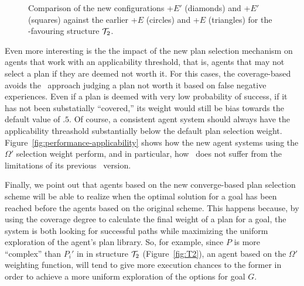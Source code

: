 \begin{figure*}[t]
\begin{center}
\subfigure[Structure $\T_2$]{\label{fig:T2_result2}

}
\qquad
\subfigure[Structure $\T_4$]{\label{fig:T4_result}

}

\caption{Comparison of the new configurations \BUL+$E'$ (diamonds) and \CL+$E'$
(squares) against the earlier \BUL+$E$ (circles) and \CL+$E$ (triangles) for the
\BUL-favouring structure $\T_2$.}
\end{center}
\end{figure*}



Even more interesting is the the impact of the new plan selection mechanism on
agents that work with an applicability threshold, that is, agents that may not
select a plan if they are deemed not worth it. For this cases, the coverage-based
avoids the \CL\ approach judging a plan not worth it based on false negative
experiences. Even if a plan is deemed with very low probability of success, if it
has not been substatially ``covered,'' its weight would still be bias towards the
default value of $.5$. Of course, a consistent agent system should always have
the applicability threashold substantially below the default plan selection
weight.
Figure~\ref{fig:performance-applicability} shows how the new agent systems
using the $\Omega'$ selection weight perform, and in particular, how \CLSELB\
does not suffer from the limitations of its previous \CLSELA\ version.


Finally, we point out that agents based on the new converge-based plan selection
scheme will be able to realize when the optimal solution for a goal has been
reached before the agents based on the original scheme.
This happens because, by using the coverage degree to calculate the final weight
of a plan for a goal, the system is both looking for successful paths while
maximizing    the uniform exploration of the agent's plan library.
So, for example, since $P$ is more ``complex'' than $P_i'$ in in structure $\T_2$
(Figure~\ref{fig:T2}), an agent based on the $\Omega'$ weighting function, will
tend to give more execution chances to the former in order to achieve a more
uniform exploration of the options for goal $G$.


 

